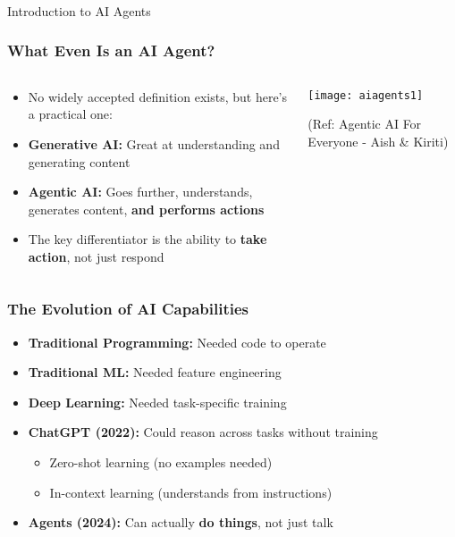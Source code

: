 \begin{frame}[fragile]\frametitle{}
\begin{center}
{\Large Introduction to AI Agents}
\end{center}
\end{frame}

\begin{frame}[fragile]\frametitle{What Even Is an AI Agent?}
\begin{columns}
    \begin{column}[T]{0.6\linewidth}
		\begin{itemize}
			\item No widely accepted definition exists, but here's a practical one:
			\item \textbf{Generative AI:} Great at understanding and generating content
			\item \textbf{Agentic AI:} Goes further, understands, generates content, \textbf{and performs actions}
			\item The key differentiator is the ability to \textbf{take action}, not just respond
		\end{itemize}

    \end{column}
    \begin{column}[T]{0.4\linewidth}
        \begin{center}
        \texttt{[image: aiagents1]}
		
		{\tiny (Ref: Agentic AI For Everyone - Aish \& Kiriti)}
        \end{center}
    \end{column}
  \end{columns}
\end{frame}

\begin{frame}[fragile]\frametitle{The Evolution of AI Capabilities}
\begin{itemize}
    \item \textbf{Traditional Programming:} Needed code to operate
    \item \textbf{Traditional ML:} Needed feature engineering
    \item \textbf{Deep Learning:} Needed task-specific training
    \item \textbf{ChatGPT (2022):} Could reason across tasks without training
    \begin{itemize}
        \item Zero-shot learning (no examples needed)
        \item In-context learning (understands from instructions)
    \end{itemize}
    \item \textbf{Agents (2024):} Can actually \textbf{do things}, not just talk
\end{itemize}
\end{frame}

